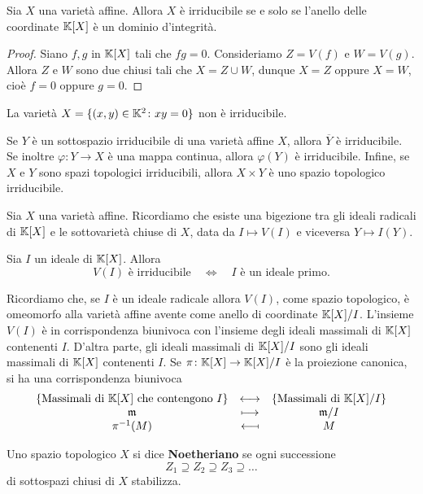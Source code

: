 \begin{remark}
    Sia $X$ una varietà affine. Allora $X$ è irriducibile se e solo se l'anello delle coordinate $\mathbb{K}[X]$ è un dominio d'integrità.
\end{remark}

\begin{proof}
    Siano $f,g$ in $\mathbb{K}[X]$ tali che $f g=0$. Consideriamo $Z=V(f)$ e $W=V(g)$. Allora $Z$ e $W$ sono due chiusi tali che $X=Z\cup W$, dunque $X=Z$ oppure $X=W$, cioè $f=0$ oppure $g=0$.
\end{proof}

\begin{example}
    La variet\`a $X=\{(x,y)\in \mathbb{K}^2 \colon xy=0\}$ non \`e irriducibile.
\end{example}

\begin{remark}
    Se $Y$ è un sottospazio irriducibile di una varietà affine $X$, allora $\overline{Y}$ è irriducibile. Se inoltre $\varphi\colon Y \to X$ è una mappa continua, allora $\varphi(Y)$ è irriducibile. Infine, se $X$ e $Y$ sono spazi topologici irriducibili, allora $X\times Y$ è uno spazio topologico irriducibile.
\end{remark}

Sia $X$ una varietà affine. Ricordiamo che esiste una bigezione tra gli ideali radicali di $\mathbb{K}[X]$ e le sottovarietà chiuse di $X$, data da $I \mapsto V(I)$ e viceversa $Y\mapsto I(Y)$. 

\begin{remark}
    Sia $I$ un ideale di $\mathbb{K}[X]$. Allora \[V(I) \text{ è irriducibile} \quad \iff \quad I \text{ è un ideale primo.}\]
\end{remark}

Ricordiamo che, se $I$ è un ideale radicale allora $V(I)$, come spazio topologico, è omeomorfo alla varietà affine avente come anello di coordinate $\mathbb{K}[X]/I$. L'insieme $V(I)$ è in corrispondenza biunivoca con l'insieme degli ideali massimali di $\mathbb{K}[X]$ contenenti $I$. D'altra parte, gli ideali massimali di $\mathbb{K}[X]/I$ sono gli ideali massimali di $\mathbb{K}[X]$ contenenti $I$. Se $\pi\colon \mathbb{K}[X]\to \mathbb{K}[X]/I$ è la proiezione canonica, si ha una corrispondenza biunivoca 
\[\begin{array}{ccc} {\left\{{\text{Massimali di $\mathbb{K}[X]$ che contengono $I$}}\right\}} & \longleftrightarrow & {\left\{{\text{Massimali di $\mathbb{K}[X]/I$}}\right\}}\\ {\mathfrak{m}} & \longmapsto & {\mathfrak{m}/I}\\ {\pi^{-1}(M)} & \longmapsfrom & {M} \end{array}\]


\begin{definition}
    Uno spazio topologico $X$ si dice \textbf{Noetheriano} se ogni successione  \[Z_1\supseteq Z_2 \supseteq Z_3 \supseteq \ldots\]
    di sottospazi chiusi di $X$ stabilizza.
\end{definition}

